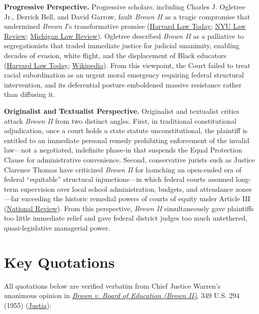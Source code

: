 \documentclass[12pt]{article}
\begin{document}
\textbf{Progressive Perspective.} Progressive scholars, including Charles J. Ogletree Jr., Derrick Bell, and David Garrow, fault \textit{Brown II} as a tragic compromise that undermined \textit{Brown I}'s transformative promise (\href{https://hls.harvard.edu/today/q-a-professor-ogletree-on-the-brown-v-board-decision/}{Harvard Law Today}; \href{https://nyulawreview.org/wp-content/uploads/2018/08/NYULawReview-80-2-Perez.pdf}{NYU Law Review}; \href{https://repository.law.umich.edu/mlr/vol103/iss6/12/}{Michigan Law Review}). Ogletree described \textit{Brown II} as a palliative to segregationists that traded immediate justice for judicial unanimity, enabling decades of evasion, white flight, and the displacement of Black educators (\href{https://hls.harvard.edu/today/q-a-professor-ogletree-on-the-brown-v-board-decision/}{Harvard Law Today}; \href{https://en.wikipedia.org/wiki/Brown_v._Board_of_Education}{Wikipedia}). From this viewpoint, the Court failed to treat racial subordination as an urgent moral emergency requiring federal structural intervention, and its deferential posture emboldened massive resistance rather than diffusing it.

\textbf{Originalist and Textualist Perspective.} Originalist and textualist critics attack \textit{Brown II} from two distinct angles. First, in traditional constitutional adjudication, once a court holds a state statute unconstitutional, the plaintiff is entitled to an immediate personal remedy prohibiting enforcement of the invalid law---not a negotiated, indefinite phase-in that suspends the Equal Protection Clause for administrative convenience. Second, conservative jurists such as Justice Clarence Thomas have criticized \textit{Brown II} for launching an open-ended era of federal ``equitable'' structural injunctions---in which federal courts assumed long-term supervision over local school administration, budgets, and attendance zones---far exceeding the historic remedial powers of courts of equity under Article III (\href{https://www.nationalreview.com/bench-memos/misrepresenting-justice-thomas-on-brown}{National Review}). From this perspective, \textit{Brown II} simultaneously gave plaintiffs too little immediate relief and gave federal district judges too much untethered, quasi-legislative managerial power.

\section{Key Quotations}

All quotations below are verified verbatim from Chief Justice Warren's unanimous opinion in \href{https://www.courtlistener.com/opinion/105312/brown-v-board-of-education/}{\textit{Brown v. Board of Education (Brown II)}}, 349 U.S. 294 (1955) (\href{https://supreme.justia.com/cases/federal/us/349/294/}{Justia}):
\end{document}
